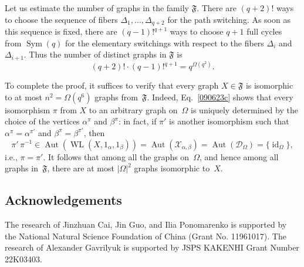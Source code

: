 \documentclass{amsart}
\newcommand{\cal}{\mathcal}
\def\cD{{\cal D}}
\def\cX{{\cal X}}
\def\fF{{\mathfrak F}}
\def\fK{{\mathfrak K}}
\DeclareMathOperator{\aut}{Aut}
\DeclareMathOperator{\id}{id}
\DeclareMathOperator{\sym}{Sym}
\DeclareMathOperator{\WL}{WL}
\begin{document}
Let us estimate the number of graphs in the family $\fF$. There are $(q+2)!$ ways to choose the sequence of fibers  $\Delta_1,\ldots,\Delta_{q+2}$ for the path switching. As soon as this sequence is fixed, there are $(q-1)!^{q+1}$  ways to choose  $q+1$ full cycles from $\sym(q)$ for the elementary switchings with respect to 
the fibers $\Delta_i$ and $\Delta_{i+1}$. 
Thus the number of distinct graphs in $\fF$ is
$$
(q+2)!\cdot (q-1)!^{q+1}=q^{\mathsf{\Omega}(q^2)}.
$$

To complete the proof, it suffices to verify that every graph $X\in\fF$ 
is isomorphic to at most $n^2=\mathsf{\Omega}(q^6)$ graphs 
from~$\fF$. Indeed, 
Eq.~\eqref{090623c} shows that every isomorphism $\pi$ from $X$ to 
an arbitrary graph on~$\Omega$ is uniquely determined by the choice of 
the vertices $\alpha^\pi$ and $\beta^\pi$: in fact, if $\pi'$ is 
another isomorphism such that $\alpha^\pi=\alpha^{\pi'}$ and $\beta^\pi=\beta^{\pi'}$, then
$$
\pi'\,\pi^{-1}\in \aut(\WL(X,1_\alpha,1_\beta))=\aut(\cX_{\alpha,\beta})=\aut(\cD_\Omega)=\{\id_\Omega\},
$$
i.e., $\pi=\pi'$. It follows that among all the graphs on~$\Omega$, and hence among all graphs in~$\fF$, there are at most $|\Omega|^2$ graphs isomorphic to~$X$.


\begin{comment}
By statement~ (1) and~(2) of Lemma~\ref{080623j}, $X$ is  the collinearity graph of a generalized quadrangle. In accordance with \cite{Higman1971}, any such graph and hence $X$ satisfies the $4$-condition. By Theorem~\ref{080623a}, this implies that
for every $X'\in\fK$, the coherent configuration $\WL(\cX')$, where  $\cX'$ is the auxiliary rainbow of~$X'$,  has two distinct fibers  that are classes of some partial parabolic of  $\WL(\cX')$. Consequently, $b(\WL(\cX'))\le 2$ by Theorem~\ref{050623c}.
\end{comment}

\subsection*{Acknowledgements}
The research of Jinzhuan Cai, Jin Guo, and Ilia Ponomarenko 
is supported by the National Natural Science Foundation of 
China (Grant No. 11961017).
The research of Alexander Gavrilyuk is supported by JSPS KAKENHI Grant Number 22K03403. 





\providecommand{\bysame}{\leavevmode\hbox to3em{\hrulefill}\thinspace}
\providecommand{\MR}{\relax\ifhmode\unskip\space\fi MR }
\providecommand{\MRhref}[2]{\href{http://www.ams.org/mathscinet-getitem?mr=#1}{#2}
}
\providecommand{\href}[2]{#2}



\end{document}
